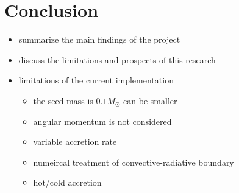 \documentclass[12pt,a4paper]{article}
\newenvironment{outline}[1]{%
  \begin{itemize}[label=\textbullet]%
  \color{#1}%
}{%
  \end{itemize}%
}
\begin{document}

\section{Conclusion}
\label{sec:conclusion}

\begin{outline}{gray}
  \item summarize the main findings of the project
  \item discuss the limitations and prospects of this research
  \item limitations of the current implementation
  \begin{itemize}
    \item the seed mass is $0.1 M_\odot$ can be smaller
    \item angular momentum is not considered
    \item variable accretion rate
    \item numeircal treatment of convective-radiative boundary
    \item hot/cold accretion
  \end{itemize}
\end{outline}



\end{document}
